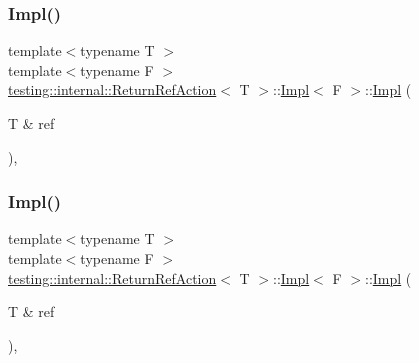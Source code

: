 \mbox{\label{classtesting_1_1internal_1_1_return_ref_action_1_1_impl_a245d797a18ba609ce99bc5a383d6c36f}} 
\subsubsection{\texorpdfstring{Impl()}{Impl()}\hspace{0.1cm}{\footnotesize\ttfamily [2/3]}}
{\footnotesize\ttfamily template$<$typename T $>$ \\
template$<$typename F $>$ \\
\mbox{\hyperlink{classtesting_1_1internal_1_1_return_ref_action}{testing\+::internal\+::\+Return\+Ref\+Action}}$<$ T $>$\+::\mbox{\hyperlink{classtesting_1_1internal_1_1_return_ref_action_1_1_impl}{Impl}}$<$ F $>$\+::\mbox{\hyperlink{classtesting_1_1internal_1_1_return_ref_action_1_1_impl}{Impl}} (\begin{DoxyParamCaption}\item[{T \&}]{ref }\end{DoxyParamCaption})\hspace{0.3cm}{\ttfamily [inline]}, {\ttfamily [explicit]}}

\mbox{\label{classtesting_1_1internal_1_1_return_ref_action_1_1_impl_a245d797a18ba609ce99bc5a383d6c36f}} 
\subsubsection{\texorpdfstring{Impl()}{Impl()}\hspace{0.1cm}{\footnotesize\ttfamily [3/3]}}
{\footnotesize\ttfamily template$<$typename T $>$ \\
template$<$typename F $>$ \\
\mbox{\hyperlink{classtesting_1_1internal_1_1_return_ref_action}{testing\+::internal\+::\+Return\+Ref\+Action}}$<$ T $>$\+::\mbox{\hyperlink{classtesting_1_1internal_1_1_return_ref_action_1_1_impl}{Impl}}$<$ F $>$\+::\mbox{\hyperlink{classtesting_1_1internal_1_1_return_ref_action_1_1_impl}{Impl}} (\begin{DoxyParamCaption}\item[{T \&}]{ref }\end{DoxyParamCaption})\hspace{0.3cm}{\ttfamily [inline]}, {\ttfamily [explicit]}}



